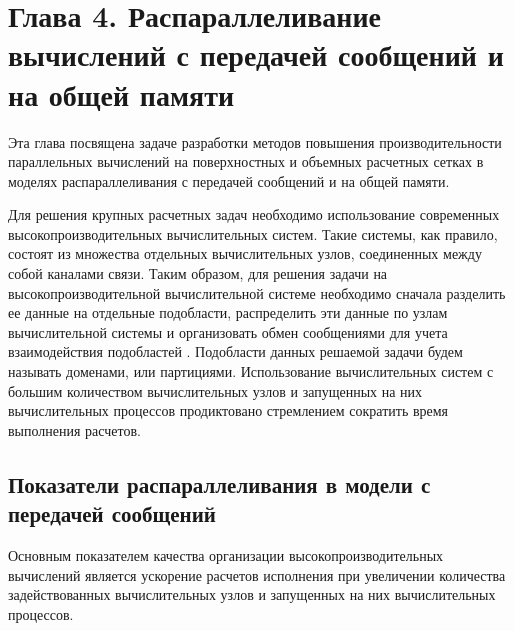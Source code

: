 \newpage
\section*{Глава 4. Распараллеливание вычислений с \mbox{передачей} сообщений и на общей памяти} %
\addtocounter{section}{1}                                                    %
\setcounter{subsection}{0}
\setcounter{figure}{0}
\setcounter{equation}{0}
\setcounter{table}{0}
\setcounter{theorem}{0}
\setcounter{lemma}{0}
\setcounter{definition}{0}

Эта глава посвящена задаче разработки методов повышения производительности параллельных вычислений на поверхностных и объемных расчетных сетках в моделях распараллеливания с передачей сообщений и на общей памяти.

Для решения крупных расчетных задач необходимо использование современных высокопроизводительных вычислительных систем.
Такие системы, как правило, состоят из множества отдельных вычислительных узлов, соединенных между собой каналами связи.
Таким образом, для решения задачи на высокопроизводительной вычислительной системе необходимо сначала разделить ее данные на отдельные подобласти, распределить эти данные по узлам вычислительной системы и организовать обмен сообщениями для учета взаимодействия подобластей \cite{GOST57700HPC}.
Подобласти данных решаемой задачи будем называть доменами, или партициями.
Использование вычислительных систем с большим количеством вычислительных узлов и запущенных на них вычислительных процессов продиктовано стремлением сократить время выполнения расчетов.


\subsection{Показатели распараллеливания в модели с \mbox{передачей} сообщений}

Основным показателем качества организации высокопроизводительных вычислений является ускорение расчетов исполнения при увеличении количества задействованных вычислительных узлов и запущенных на них вычислительных процессов.

